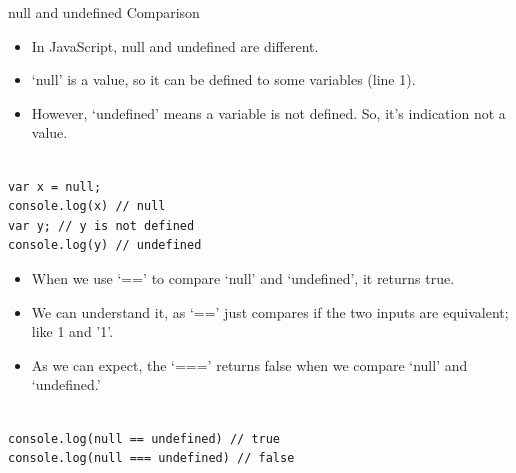 \begin{frame}[fragile]{null and undefined Comparison}

\begin{itemize}
	\item In JavaScript, null and undefined are different. 
	\item `null' is a value, so it can be defined to some variables (line 1). 
	\item However, `undefined' means a variable is not defined. So, it's indication not a value. 
\end{itemize}

\begin{Code}{}%
\begin{lstlisting}[firstnumber=1, label=glabels, xleftmargin=0pt, basicstyle=\scriptsize]% 

var x = null; 
console.log(x) // null
var y; // y is not defined
console.log(y) // undefined
\end{lstlisting}%
\end{Code}%

\end{frame}

\begin{frame}[fragile]{}

\begin{itemize}
	\item When we use `==' to compare `null' and `undefined', it returns true. 
	\item We can understand it, as `==' just compares if the two inputs are equivalent; like 1 and '1'.
	\item As we can expect, the `===' returns false when we compare `null' and `undefined.'
\end{itemize}

\begin{Code}{}%
\begin{lstlisting}[firstnumber=1, label=glabels, xleftmargin=0pt, basicstyle=\scriptsize]% 

console.log(null == undefined) // true
console.log(null === undefined) // false
\end{lstlisting}%
\end{Code}%

\end{frame}
